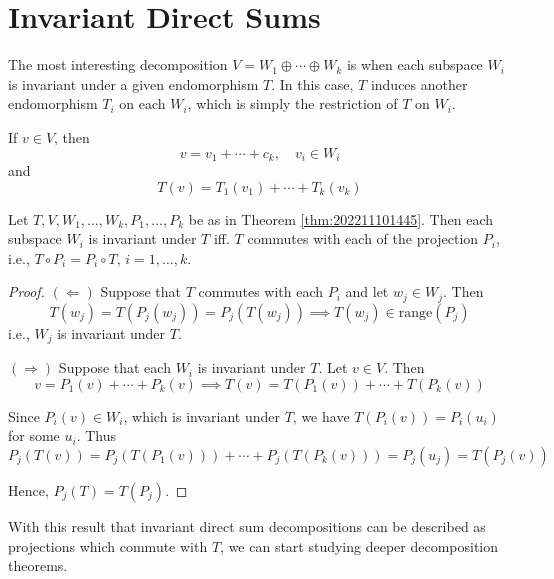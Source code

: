 \section{Invariant Direct Sums}

The most interesting decomposition $V = W_1 \oplus \cdots \oplus W_k$ is when each subspace $W_i$ is invariant under a given endomorphism $T$. In this case, $T$ induces another endomorphism $T_i$ on each $W_i$, which is simply the restriction of $T$ on $W_i$.

If $v \in V$, then
\[
	v = v_1 + \cdots + c_k, \quad v_i \in W_i
\]
and 
\[
	T(v) = T_1(v_1) + \cdots + T_k(v_k)
\]

\begin{theorem}
	Let $T, V, W_1, \ldots, W_k, P_1, \ldots, P_k$ be as in Theorem \ref{thm:202211101445}. Then each subspace $W_i$ is invariant under $T$ iff. $T$ commutes with each of the projection $P_i$, i.e., $T \circ P_i = P_i \circ T$, $i = 1, \ldots, k$.
\end{theorem}

\begin{proof}
	$(\Leftarrow)$ Suppose that $T$ commutes with each $P_i$ and let $w_j \in W_j$. Then
	\[
		T(w_j) = T(P_j(w_j)) = P_j(T(w_j)) \implies T(w_j) \in \text{range}(P_j)
	\]
	i.e., $W_j$ is invariant under $T$.

	$(\Rightarrow)$ Suppose that each $W_i$ is invariant under $T$. Let $v \in V$. Then 
	\[
		v = P_1(v) + \cdots + P_k(v) \implies T(v) = T(P_1(v)) + \cdots + T(P_k(v))
	\]

	Since $P_i(v) \in W_i$, which is invariant under $T$, we have $T(P_i(v)) = P_i(u_i)$ for some $u_i$. Thus
	\[
		P_j(T(v)) = P_j(T(P_1(v))) + \cdots + P_j(T(P_k(v))) = P_j(u_j) = T(P_j(v))
	\]

	Hence, $P_j(T) = T(P_j)$.
\end{proof}

With this result that invariant direct sum decompositions can be described as projections which commute with $T$, we can start studying deeper decomposition theorems.

